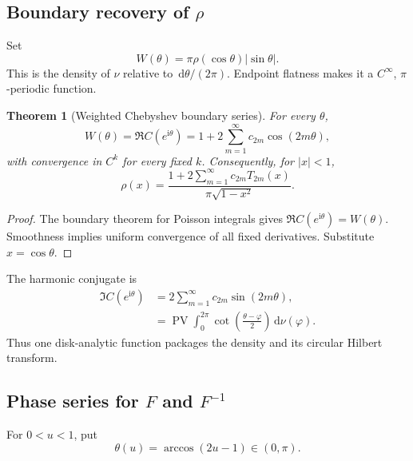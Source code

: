 \documentclass[11pt,oneside]{article}
\newtheorem{theorem}{Theorem}[section]
\theoremstyle{definition}
\newcommand{\dd}{\,\mathrm d}
\newcommand{\ii}{\mathrm i}
\newcommand{\PV}{\operatorname{PV}}
\begin{document}
\subsection{Boundary recovery of \(\rho\)}

Set
\begin{equation}
 W(\theta)=\pi\rho(\cos\theta)|\sin\theta|.
 \label{eq:W-def}
\end{equation}
This is the density of \(\nu\) relative to \(\dd\theta/(2\pi)\). Endpoint flatness makes it a
\(C^\infty\), \(\pi\)-periodic function.

\begin{theorem}[Weighted Chebyshev boundary series]
\label{thm:boundary-rho}
For every \(\theta\),
\begin{equation}
 W(\theta)=\Re C(e^{\ii\theta})
 =1+2\sum_{m=1}^{\infty}c_{2m}\cos(2m\theta),
 \label{eq:W-Fourier}
\end{equation}
with convergence in \(C^k\) for every fixed \(k\). Consequently, for \(|x|<1\),
\begin{equation}
 \boxed{\displaystyle
 \rho(x)=\frac{1+2\sum_{m=1}^{\infty}c_{2m}T_{2m}(x)}
 {\pi\sqrt{1-x^2}}.}
 \label{eq:rho-weighted-Cheb}
\end{equation}
\end{theorem}

\begin{proof}
The boundary theorem for Poisson integrals gives \(\Re C(e^{\ii\theta})=W(\theta)\). Smoothness
implies uniform convergence of all fixed derivatives. Substitute \(x=\cos\theta\).
\end{proof}

The harmonic conjugate is
\begin{align}
 \Im C(e^{\ii\theta})
 &=2\sum_{m=1}^{\infty}c_{2m}\sin(2m\theta),
 \label{eq:C-imag-series}\\
 &=\PV\int_0^{2\pi}\cot\!\left(\frac{\theta-\varphi}{2}\right)\dd\nu(\varphi).
 \label{eq:C-Hilbert}
\end{align}
Thus one disk-analytic function packages the density and its circular Hilbert transform.

\subsection{Phase series for \(F\) and \(F^{-1}\)}

For \(0<u<1\), put
\begin{equation}
 \theta(u)=\arccos(2u-1)\in(0,\pi).
 \label{eq:theta-u}
\end{equation}
\end{document}
